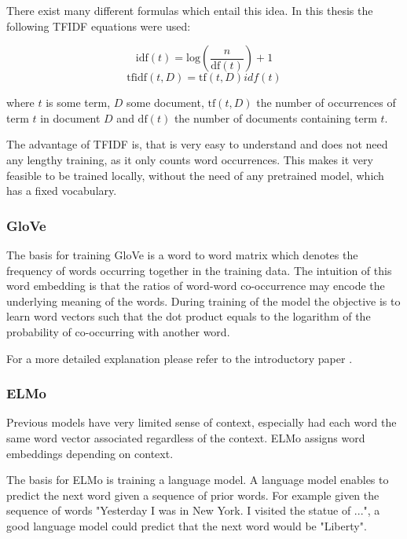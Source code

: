 \documentclass[draft,final,oneside]{vutinfth} %
\begin{document}
There exist many different formulas which entail this idea. In this thesis the following TFIDF equations were used:

\begin{equation}
\text{idf}(t) = \text{log} \left(\dfrac{n}{\text{df}(t)} \right) + 1
\end{equation}
\begin{equation}
\text{tfidf}(t, D) = \text{tf}(t, D)idf(t)
\end{equation}


where $t$ is some term, $D$ some document, $\text{tf}(t, D)$ the number of occurrences of term $t$ in document $D$ and $\text{df}(t)$ the number of documents containing term $t$.

The advantage of TFIDF is, that is very easy to understand and does not need any lengthy training, as it only counts word occurrences. This makes it very feasible to be trained locally, without the need of any pretrained model, which has a fixed vocabulary.

\subsubsection{GloVe \cite{glovepage}}
The basis for training GloVe is a word to word matrix which denotes the frequency of words occurring together in the training data. The intuition of this word embedding is that the ratios of word-word co-occurrence may encode the underlying meaning of the words. During training of the model the objective is to learn word vectors such that the dot product equals to the logarithm of the probability of co-occurring with another word.

For a more detailed explanation please refer to the introductory paper \cite{glovepage}.

\subsubsection{ELMo \cite{elmo}}
Previous models have very limited sense of context, especially had each word the same word vector associated regardless of the context. ELMo assigns word embeddings depending on context.

The basis for ELMo is training a language model. A language model enables to predict the next word given a sequence of prior words. For example given the sequence of words "Yesterday I was in New York. I visited the statue of ...", a good language model could predict that the next word would be "Liberty".
\end{document}

